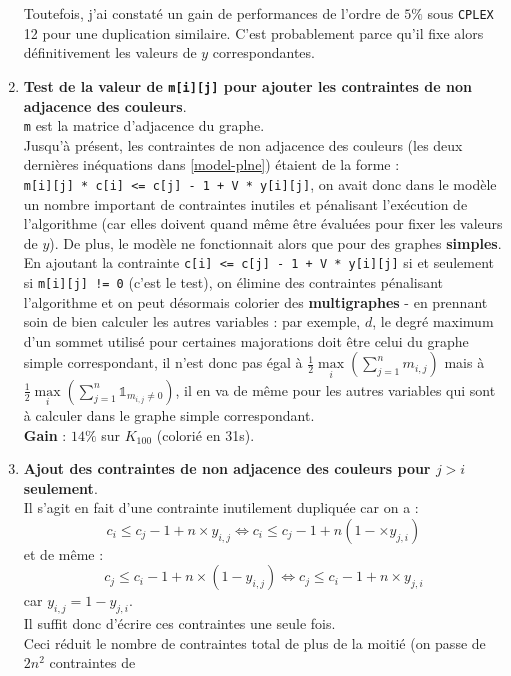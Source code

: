 \begin{enumerate}
      Toutefois, j'ai constaté un gain de performances de l'ordre de $5\%$ sous \verb?CPLEX? 12 pour une duplication
      similaire. C'est probablement parce qu'il fixe alors définitivement les valeurs de $y$ correspondantes.
 \item \label{p4}\textbf{Test de la valeur de \verb?m[i][j]? pour ajouter les contraintes de non adjacence des couleurs}.\\
      \verb?m? est la matrice d'adjacence du graphe.\\
      Jusqu'à présent, les contraintes de non adjacence des couleurs (les deux dernières inéquations dans
      \ref{model-plne}) étaient de la forme :\\
      \verb?m[i][j] * c[i] <= c[j] - 1 + V * y[i][j]?,
      on avait donc dans le modèle un nombre important de contraintes inutiles et pénalisant l'exécution de l'algorithme (car
      elles doivent quand même être évaluées pour fixer les valeurs de $y$). De plus, le modèle ne fonctionnait
      alors que pour des graphes \textbf{simples}.\\
      En ajoutant la contrainte \verb?c[i] <= c[j] - 1 + V * y[i][j]?
      si et seulement si \verb?m[i][j] != 0? (c'est le test), on élimine des contraintes pénalisant l'algorithme
      et on peut désormais colorier des \textbf{multigraphes} - en prennant soin de bien calculer les autres variables :
      par exemple, $d$, le degré maximum d'un sommet utilisé pour certaines majorations doit être
      celui du graphe simple correspondant, il n'est donc pas égal à
      $\frac{1}{2}\underset{i}{\max}(\sum_{j=1}^n m_{i,j})$ mais à
      $\frac{1}{2}\underset{i}{\max}(\sum_{j=1}^n \mathds{1}_{m_{i,j}\neq0})$,
      il en va de même pour les autres variables qui sont à calculer dans
      le graphe simple correspondant.\\
      \textbf{Gain} : $14\%$ sur $K_{100}$ (colorié en 31s).   
 \item \textbf{Ajout des contraintes de non adjacence des couleurs pour $j > i$ seulement}.\\
      Il s'agit en fait d'une contrainte inutilement dupliquée car on a :
      $$c_i \leq c_j - 1 + n\times y_{i,j} \Leftrightarrow c_i \leq c_j - 1 + n(1 - \times y_{j,i})$$
      et de même :
      $$c_j \leq c_i - 1 + n\times (1-y_{i,j}) \Leftrightarrow c_j \leq c_i - 1 + n\times y_{j,i}$$
      car $y_{i,j}=1-y_{j,i}$.\\
      Il suffit donc d'écrire ces contraintes une seule fois.\\
      Ceci réduit le nombre de contraintes total de plus de la moitié (on passe de $2n^2$ contraintes de

\end{enumerate}
